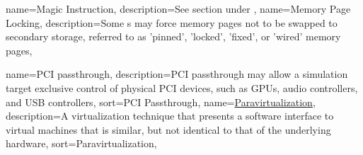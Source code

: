 \newcommand{\dvttermlinux}{Linux}
\newcommand{\dvttermlockheedmartin}{Lockheed Martin}

\newcommand{\dvttermmipsecond}{\dvtcmdabbrev{dvtglossmipssecond}}
\newcommand{\dvttermmicrosoft}{Microsoft}
{
  name={Magic Instruction},
  description={See section  under },
}
\newcommand{\dvttermmagicinstruction}{\dvtcmdcaponcegloss{dvtglossmagicinstruction}{Magic Instruction}}
\newcommand{\dvttermmmu}{\dvtcmdabbrev{dvtglossmmu}}
{
  name={Memory Page Locking},
  description={Some \dvttermos s may force memory pages not to be swapped to secondary storage, referred to as 'pinned', 'locked', 'fixed', or 'wired' memory pages},
}

\newcommand{\dvttermnasa}{NASA}
\newcommand{\dvttermnortel}{Nortel Networks Corporation}
\newcommand{\dvttermnorthropgrumman}{Northrop Grumman Corporation}

\newcommand{\dvttermopengl}{OpenGL}
\newcommand{\dvttermopengles}{\dvttermopengl ~ES}
\newcommand{\dvttermopenglestwopointo}{\dvttermopengles ~\dvtcmdnum{2.0}}
\newcommand{\dvttermos}{\dvtcmdabbrev{dvtglossos}}

\newcommand{\dvttermpci}{\dvtcmdabbrev{dvtglosspci}}
{
  name={PCI passthrough},
  description={PCI passthrough may allow a simulation target exclusive control of physical PCI devices, such as GPUs, audio controllers, and USB controllers},
  sort={PCI Passthrough},
}
\newcommand{\dvttermpcipassthrough}{\dvttermpci\ \dvtcmdcaponcegloss{dvtglosspcipassthrough}{Passthrough}}
{
  name=\href{http://en.wikipedia.org/wiki/Paravirtualization}{Paravirtualization},
  description={A virtualization technique that presents a software interface to virtual machines that is similar, but not identical to that of the underlying hardware},
  sort={Paravirtualization},
}
\newcommand{\dvttermparavirtualization}{\dvtcmdcaponcegloss{dvtglossparavirtualization}{Paravirtualization}}
\newcommand{\dvttermpython}{\texttt{Python}}

